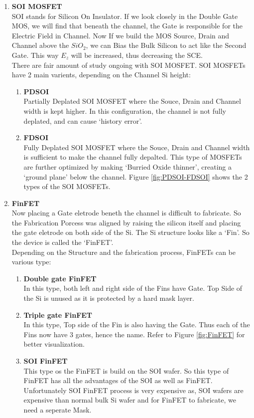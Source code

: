 \documentclass[a4paper]{article}
\begin{document}
\begin{enumerate}
\item \textbf{SOI MOSFET}\\
  SOI stands for Silicon On Insulator. If we look closely in the Double Gate MOS, we will find that beneath the channel, the Gate is responsible for the Electric Field in Channel. Now If we build the MOS Source, Drain and Channel above the $SiO_2$, we can Bias the Bulk Silicon to act like the Second Gate. This way $E_z$ will be increased, thus decreasing the SCE.\\

  There are fair amount of study ongoing with SOI MOSFET. SOI MOSFETs have 2 main varients, depending on the Channel Si height:
  \begin{enumerate}
  \item \textbf{PDSOI}\\
    Partially Deplated SOI MOSFET where the Souce, Drain and Channel width is kept higher. In this configuration, the channel is not fully deplated, and can cause `history error'.
  \item \textbf{FDSOI}\\
    Fully Deplated SOI MOSFET where the Souce, Drain and Channel width is sufficient to make the channel fully depalted. This type of MOSFETs are further optimized by making `Burried Oxide thinner', creating a `ground plane' below the channel. Figure \ref{fig:PDSOI-FDSOI} shows the 2 types of the SOI MOSFETs.
  \end{enumerate}

\item \textbf{FinFET}\\
  Now placing a Gate eletrode beneth the channel is difficult to fabricate. So the Fabrication Porcess was aligned by raising the silicon itself and placing the gate eletrode on both side of the Si. The Si structure looks like a `Fin'. So the device is called the `FinFET'.\\

  Depending on the Structure and the fabrication process, FinFETs can be various type:
  \begin{enumerate}
  \item \textbf{Double gate FinFET}\\
    In this type, both left and right side of the Fins have Gate. Top Side of the Si is unused as it is protected by a hard mask layer.
  \item \textbf{Triple gate FinFET}\\
    In this type, Top side of the Fin is also having the Gate. Thus each of the Fins now have 3 gates, hence the name. Refer to Figure \ref{fig:FinFET} for better visualization.
  \item \textbf{SOI FinFET}\\
    This type os the FinFET is build on the SOI wafer. So this type of FinFET has all the advantages of the SOI as well as FinFET. Unfortunately SOI FinFET process is very expensive as, SOI wafers are expensive than normal bulk Si wafer and for FinFET to fabricate, we need a seperate Mask.
  \end{enumerate}
\end{enumerate}
\end{document}
